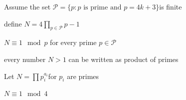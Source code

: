 \label{#1}

Assume the set $\mathcal P = \{p: p\text{ is prime and } p=4k+3\}$​ is finite
\label{#2}

define $N = 4\prod_{p \in \mathcal P} p - 1$​
\label{#3}

$N \equiv 1 \mod p$ for every prime $p \in \mathcal{P}$ ​
\label{fundalmental theorem of arithmetic}

every number $N > 1$ can be​ written as product of primes
\label{#4}

Let $N = \prod p_i^{a_i}$​ for $p_i$ are primes
\label{#5}

$N \equiv 1 \mod 4$​
\label{contradiction}

